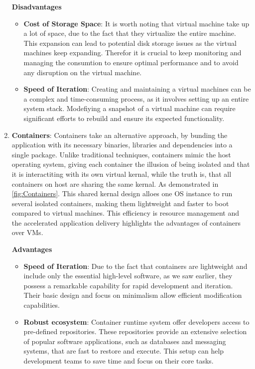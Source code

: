 \begin{enumerate}
          \textbf{Disadvantages}
          \begin{itemize}
              \item \textbf{Cost of Storage Space}: It is worth noting that virtual machine take up a lot of space, due to the fact that they virtualize the entire machine. This expansion can lead to potential disk storage issues as the virtual machines keep expanding. Therefor it is crucial to keep monitoring and managing the consumtion to ensure optimal performance and to avoid any disruption on the virtual machine.
              \item \textbf{Speed of Iteration}: Creating and maintaining a virtual machines can be a complex and time-consuming process, as it involves setting up an entire system stack. Modefiying a snapshot of a virtual machine can require significant efforts to rebuild and ensure its expected functionality.  
          \end{itemize}
    \item \textbf{Containers}: Containers take an alternative approach, by bunding the application with its necessary binaries, libraries and dependencies into a single package. Unlike traditional techniques, containers mimic the host operating system, giving each container the illusion of being isolated and that it is interactiting with its own virtual kernal, while the truth is, that all containers on host are sharing the same kernal. As demonstrated in \autoref{fig:Containers}. This shared kernal design alloes one \ac{OS} instance to run several isolated containers, making them lightweight and faster to boot compared to virtual machines. This efficiency is resource management and the accelerated application delivery highlights the advantages of containers over \ac{VMs}.
          
          \newline
          \textbf{Advantages}
          \begin{itemize}
              \item \textbf{Speed of Iteration}: Due to the fact that containers are lightweight and include only the essential high-level software, as we saw earlier, they possess a remarkable capability for rapid development and iteration. Their basic design and focus on minimalism allow efficient modification capabilities.
              \item \textbf{Robust ecosystem}: Container runtime system offer developers access to pre-defined repositories. These repositories provide an extensive selection of popular software applications, such as databases and messaging systems, that are fast to restore and execute. This setup can help development teams to save time and focus on their core tasks.
          \end{itemize}


\end{enumerate}
